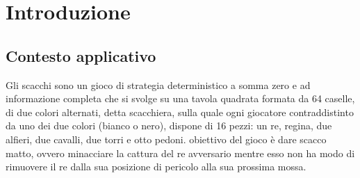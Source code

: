 \chapter{Introduzione}

\section{Contesto applicativo} %
Gli scacchi sono un gioco di strategia deterministico a somma zero e ad informazione completa  
che si svolge su una tavola quadrata formata da 64 caselle, di due colori alternati,
detta scacchiera, sulla quale ogni giocatore contraddistinto da uno dei due colori (bianco o nero), dispone di 16 pezzi: un re, regina, due alfieri, due cavalli, due torri e otto pedoni.
obiettivo del gioco è dare scacco matto, ovvero minacciare la cattura del re avversario mentre esso non
ha modo di rimuovere il re dalla sua posizione di pericolo alla sua prossima mossa.



